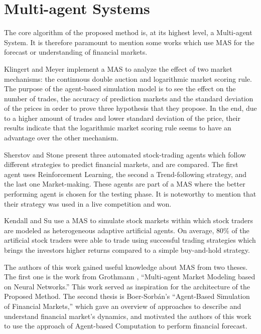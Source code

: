 \section{Multi-agent Systems}
\label{section:multi-agent-systems}


The core algorithm of the proposed method is, at its highest level, a
Multi-agent System. It is therefore paramount to mention some works which use
MAS for the forecast or understanding of financial markets.

Klingert and Meyer \cite{Klingert_2012} implement a MAS to analyze the effect of
two market mechanisms: the continuous double auction and logarithmic market
scoring rule. The purpose of the agent-based simulation model is to see the
effect on the number of trades, the accuracy of prediction markets and the
standard deviation of the prices in order to prove three hypothesis that they
propose. In the end, due to a higher amount of trades and lower standard
deviation of the price, their results indicate that the logarithmic market
scoring rule seems to have an advantage over the other mechanism.

Sherstov and Stone \cite{Sherstov2005} present three automated stock-trading
agents which follow different strategies to predict financial markets, and are
compared. The first agent uses Reinforcement Learning, the second a
Trend-following strategy, and the last one Market-making. These agents are part
of a MAS where the better performing agent is chosen for the testing phase. It
is noteworthy to mention that their strategy was used in a live competition and
won.

Kendall and Su \cite{Kendall2003} use a MAS to simulate stock markets within
which stock traders are modeled as heterogeneous adaptive artificial agents. On
average, 80\% of the artificial stock traders were able to trade using
successful trading strategies which brings the investors higher returns compared
to a simple buy-and-hold strategy.

The authors of this work gained useful knowledge about MAS from two theses. The
first one is the work from Grothmann \cite{Grothmann2002}, ``Multi-agent Market
Modeling based on Neural Networks.'' This work served as inspiration for the
architecture of the Proposed Method. The second thesis is Boer-Sorb{\'{a}}n's
``Agent-Based Simulation of Financial Markets,'' which gave an overview of
approaches to describe and understand financial market's dynamics, and motivated
the authors of this work to use the approach of Agent-based Computation to
perform financial forecast.

